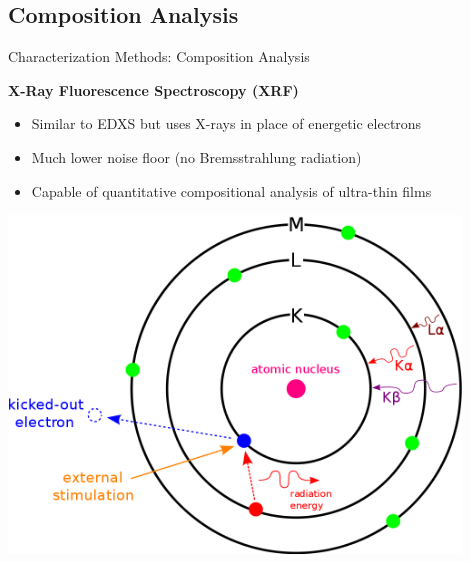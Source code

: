 \documentclass[professionalfont]{beamer}
\begin{document}
\subsection{Composition Analysis}
\begin{frame}{Characterization Methods: Composition Analysis}

\begin{overprint}
		\vspace{0.5cm}
		\textbf{\large X-Ray Fluorescence Spectroscopy (XRF)}\vspace{1.5em}
		\begin{itemize}
			\item Similar to EDXS but uses X-rays in place of energetic electrons\vspace{1.5em}
			\item Much lower noise floor (no Bremsstrahlung radiation)\vspace{1.5em}
			\item Capable of quantitative compositional analysis of ultra-thin films
		\end{itemize}
	\vspace{-0.5cm}\centerline{\includegraphics[width=0.9\textwidth]{./graphics/characterization/EDXS-scheme}}
\end{overprint}

\end{frame}
\end{document}
